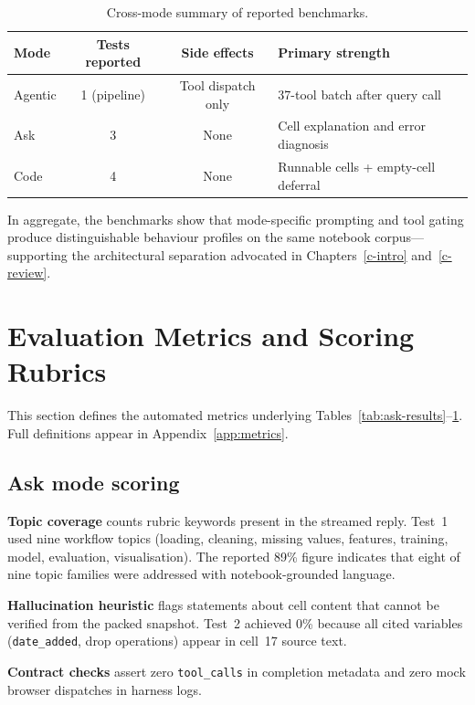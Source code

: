 \begin{table}[!ht]
\centering
\caption{Cross-mode summary of reported benchmarks.}
\label{tab:cross-mode}
\small
\begin{tabular}{|l|c|c|p{4.2cm}|}
\hline
\textbf{Mode} & \textbf{Tests reported} & \textbf{Side effects} & \textbf{Primary strength} \\ \hline
Agentic & 1 (pipeline) & Tool dispatch only & 37-tool batch after query call \\
Ask & 3 & None & Cell explanation and error diagnosis \\
Code & 4 & None & Runnable cells + empty-cell deferral \\ \hline
\end{tabular}
\end{table}

In aggregate, the benchmarks show that mode-specific prompting and tool gating produce distinguishable behaviour profiles on the same notebook corpus---supporting the architectural separation advocated in Chapters~\ref{c-intro} and~\ref{c-review}.

\section{Evaluation Metrics and Scoring Rubrics}
\label{sec:results-metrics}

This section defines the automated metrics underlying Tables~\ref{tab:ask-results}--\ref{tab:cross-mode}. Full definitions appear in Appendix~\ref{app:metrics}.

\subsection{Ask mode scoring}

\textbf{Topic coverage} counts rubric keywords present in the streamed reply. Test~1 used nine workflow topics (loading, cleaning, missing values, features, training, model, evaluation, visualisation). The reported 89\% figure indicates that eight of nine topic families were addressed with notebook-grounded language.

\textbf{Hallucination heuristic} flags statements about cell content that cannot be verified from the packed snapshot. Test~2 achieved 0\% because all cited variables (\texttt{date\_added}, drop operations) appear in cell~17 source text.

\textbf{Contract checks} assert zero \texttt{tool\_calls} in completion metadata and zero mock browser dispatches in harness logs.

